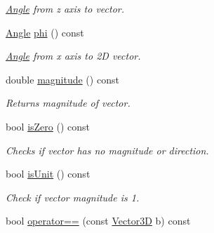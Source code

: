 \begin{DoxyCompactItemize}
\begin{DoxyCompactList}\small\item\em \hyperlink{class_angle}{Angle} from z axis to vector. \end{DoxyCompactList}\item 
\hypertarget{class_vector3_d_a84fef530c6610b732957788da80e42f3}{\hyperlink{class_angle}{Angle} \hyperlink{class_vector3_d_a84fef530c6610b732957788da80e42f3}{phi} () const }\label{class_vector3_d_a84fef530c6610b732957788da80e42f3}

\begin{DoxyCompactList}\small\item\em \hyperlink{class_angle}{Angle} from x axis to 2\+D vector. \end{DoxyCompactList}\item 
\hypertarget{class_vector3_d_ac5b3b5fdce5c8de7a405e731ea2825ba}{double \hyperlink{class_vector3_d_ac5b3b5fdce5c8de7a405e731ea2825ba}{magnitude} () const }\label{class_vector3_d_ac5b3b5fdce5c8de7a405e731ea2825ba}

\begin{DoxyCompactList}\small\item\em Returns magnitude of vector. \end{DoxyCompactList}\item 
\hypertarget{class_vector3_d_a93ac7c02548274417286170cc26b18f4}{bool \hyperlink{class_vector3_d_a93ac7c02548274417286170cc26b18f4}{is\+Zero} () const }\label{class_vector3_d_a93ac7c02548274417286170cc26b18f4}

\begin{DoxyCompactList}\small\item\em Checks if vector has no magnitude or direction. \end{DoxyCompactList}\item 
\hypertarget{class_vector3_d_a1cd7d48d3e97fc2d6764968865f6a7ec}{bool \hyperlink{class_vector3_d_a1cd7d48d3e97fc2d6764968865f6a7ec}{is\+Unit} () const }\label{class_vector3_d_a1cd7d48d3e97fc2d6764968865f6a7ec}

\begin{DoxyCompactList}\small\item\em Check if vector magnitude is 1. \end{DoxyCompactList}\item 
\hypertarget{class_vector3_d_a35b4835bfa487fe3d92f86ca591188fe}{bool \hyperlink{class_vector3_d_a35b4835bfa487fe3d92f86ca591188fe}{operator==} (const \hyperlink{class_vector3_d}{Vector3\+D} b) const }\label{class_vector3_d_a35b4835bfa487fe3d92f86ca591188fe}


\end{DoxyCompactItemize}
